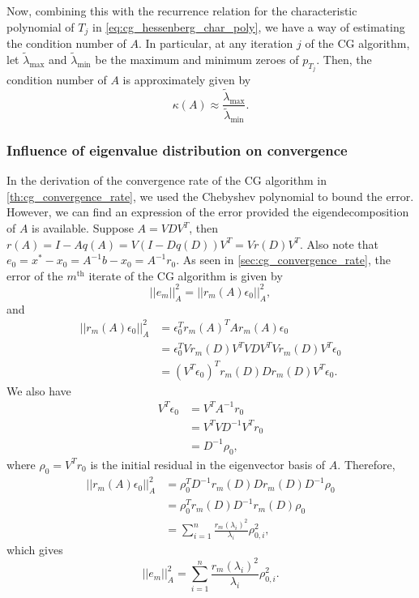 Now, combining this with the recurrence relation for the characteristic polynomial of $T_j$ in \cref{eq:cg_hessenberg_char_poly}, we have a way of estimating the condition number of $A$. In particular, at any iteration $j$ of the CG algorithm, let $\tilde{\lambda}_{\text{max}}$ and $\tilde{\lambda}_{\text{min}}$ be the maximum and minimum zeroes of $p_{T_j}$. Then, the condition number of $A$ is approximately given by
\begin{equation}
  \kappa(A) \approx \frac{\tilde{\lambda}_{\text{max}}}{\tilde{\lambda}_{\text{min}}}.
  \label{eq:cg_condition_number_estimate}
\end{equation}

\subsubsection{Influence of eigenvalue distribution on convergence}\label{sec:cg_eigenvalue_distribution}
In the derivation of the convergence rate of the CG algorithm in \ref{th:cg_convergence_rate}, we used the Chebyshev polynomial to bound the error. However, we can find an expression of the error provided the eigendecomposition of $A$ is available. Suppose $A = VDV^T$, then $r(A) = I - Aq(A) = V(I - Dq(D))V^T = Vr(D)V^T$. Also note that $e_0 = x^* - x_0 = A^{-1}b - x_0 = A^{-1}r_0$. As seen in \cref{sec:cg_convergence_rate}, the error of the $m^{\text{th}}$ iterate of the CG algorithm is given by
\begin{equation*}
  ||e_m||_A^2 = ||r_m(A)\epsilon_0||_A^2,
\end{equation*}
and
\begin{align*}
  ||r_m(A)\epsilon_0||_A^2 & = \epsilon_0^T r_m(A)^T A r_m(A) \epsilon_0                 \\
                           & = \epsilon_0^T V r_m(D) V^T V D V^T V r_m(D) V^T \epsilon_0 \\
                           & = (V^T\epsilon_0)^T r_m(D) D r_m(D) V^T \epsilon_0.
\end{align*}
We also have
\begin{align*}
  V^T\epsilon_0 & = V^T A^{-1} r_0       \\
                & = V^T V D^{-1} V^T r_0 \\
                & = D^{-1} \rho_0,
\end{align*}
where $\rho_0 = V^T r_0$ is the initial residual in the eigenvector basis of $A$. Therefore,
\begin{align*}
  ||r_m(A)\epsilon_0||_A^2 & = \rho_0^T D^{-1} r_m(D) D r_m(D) D^{-1} \rho_0                 \\
                           & = \rho_0^T r_m(D) D^{-1} r_m(D)  \rho_0                         \\
                           & = \sum_{i=1}^n \frac{r_m(\lambda_i)^2}{\lambda_i} \rho_{0,i}^2,
\end{align*}
which gives
\begin{equation}
  ||e_m||_A^2 = \sum_{i=1}^n \frac{r_m(\lambda_i)^2}{\lambda_i} \rho_{0,i}^2.
  \label{eq:cg_error_eigenvalue}
\end{equation}

